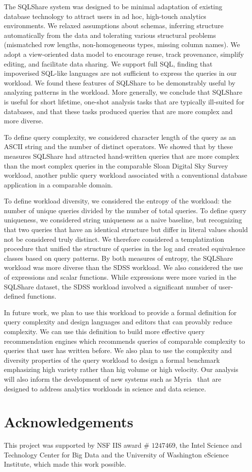 \documentclass{sig-alternate}
\newcommand{\sqlshare}{SQLShare}
\begin{document}
The \sqlshare{} system was designed to be  minimal adaptation of existing database technology to attract users in ad hoc, high-touch analytics environments.  We relaxed assumptions about schemas, inferring structure automatically from the data and tolerating various structural problems (mismatched row lengths, non-homogeneous types, missing column names).  We adopt a view-oriented data model to encourage reuse, track provenance, simplify editing, and facilitate data sharing. We support full SQL, finding that impoverised SQL-like languages are not sufficient to express the queries in our workload.  
We found these features of \sqlshare{} to be demonstrably useful by analyzing patterns in the workload.  More generally, we conclude that \sqlshare{} is useful for short lifetime, one-shot analysis tasks that are typically ill-suited for databases, and that these tasks produced queries that are more complex and more diverse.

To define query complexity, we considered character length of the query as an ASCII string and the number of distinct operators.  We showed that by these measures \sqlshare{} had attracted hand-written queries that are more complex than the most complex queries in the comparable Sloan Digital Sky Survey workload, another public query workload associated with a conventional database application in a comparable domain.

To define workload diversity, we considered the entropy of the workload: the number of unique queries divided by the number of total queries.  To define query uniqueness, we considered string uniqueness as a naive baseline, but recognizing that two queries that have an identical structure but differ in literal values should not be considered truly distinct.  We therefore considered a templatization procedure that unified the structure of queries in the log and created equivalence classes based on query patterns.  By both measures of entropy, the \sqlshare{} workload was more diverse than the SDSS workload.  We also considered the use of expressions and scalar functions.  While expressions were more varied in the \sqlshare{} dataset, the SDSS workload involved a significant number of user-defined functions.


In future work, we plan to use this workload to provide a formal definition for query complexity and design languages and editors that can provably reduce complexity.
We can use this definition to build more effective query recommendation engines which recommends queries of comparable complexity to queries that user has written before. 
We also plan to use the complexity and diversity properties of the query workload to design a formal benchmark emphasizing high variety rather than hig volume or high velocity.
Our analysis will also inform the development of new systems such as Myria~\cite{halperin2014demonstration} that are designed to address analytics workloads in science and data science.


\section{Acknowledgements}

This project was supported by NSF IIS award \# $1247469$, the Intel Science and Technology Center for Big Data
and the University of Washington eScience Institute, which made this work possible.

\newpage


\end{document}
